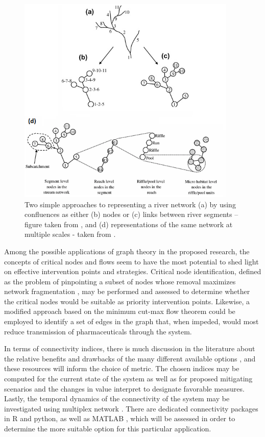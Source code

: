\documentclass{article}
\begin{document}
\begin{figure}[h]
    \centering
    \includegraphics[height=10cm]{fig_graph_eros.png}
    \caption{Two simple approaches to representing a river network (a) by using confluences as either (b) nodes or (c) links between river segments  – figure taken from \citet{Eros2011NetworkApproach},
 and (d) representations of the same network at multiple scales - taken from \citet{Eros2012CharacterizingGraphs}. 
}
    \label{fig_graph_eros}
\end{figure}

Among the possible applications of graph theory in the proposed research, the concepts of critical nodes and flows seem to have the most potential to shed light on effective intervention points and strategies. Critical node identification, defined as the problem of pinpointing a subset of nodes whose removal maximizes network fragmentation \citep{Lalou2018TheSurvey,Sarker2019CriticalNetworks}, may be performed and assessed to determine whether the critical nodes would be suitable as priority intervention points. Likewise, a modified approach based on the minimum cut-max flow theorem \citep{Anderson2020ComplexApplications} could be employed to identify a set of edges in the graph that, when impeded, would most reduce transmission of pharmaceuticals through the system.

In terms of connectivity indices, there is much discussion in the literature about the relative benefits and drawbacks of the many different available options \citep{Ali2010ShoppingCatchment,Saura2007AStudy}, and these resources will inform the choice of metric. The chosen indices may be computed for the current state of the system as well as for proposed mitigating scenarios and the changes in value interpret to designate favorable measures. Lastly, the temporal dynamics of the connectivity of the system may be investigated using multiplex network \citep{Pearson2020SedimentPathways}. 
There are dedicated connectivity packages in R and python, as well as MATLAB \citep{Rubinov2010ComplexInterpretations}, which will be assessed in order to determine the more suitable option for this particular application.
\end{document}
